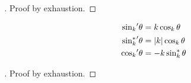\documentclass[stu, babel, american, biblatex, a4paper, leqno, draftall]{apa7}
\begin{document}
\begin{proof}[]
    Proof by exhaustion.
\end{proof}
\begin{proposition}\label{M:Trigonometry:Derivative}
    \begin{align*}
        {\sin_k}^\prime{\theta} &= k\cos_k{\theta} \\
        {\sin_k^\ast}^\prime{\theta} &= \lvert k\rvert\cos_k{\theta} \\
        {\cos_k}^\prime{\theta} &= -k\sin_k^\ast{\theta}
    \end{align*}
\end{proposition}
\begin{proof}[]
    Proof by exhaustion.
\end{proof}
\end{document}
